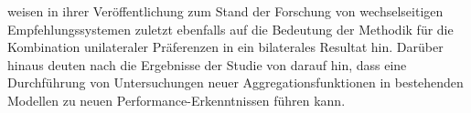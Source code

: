 \textcite[S. 41f.]{palomares:article} weisen in ihrer Veröffentlichung zum Stand der Forschung von wechselseitigen Empfehlungssystemen zuletzt ebenfalls auf die Bedeutung der Methodik für die Kombination unilateraler Präferenzen in ein bilaterales Resultat hin.
Darüber hinaus deuten nach \textcite[S. 42]{palomares:article} die Ergebnisse der Studie von \textcite[S. 4031ff.]{neve:inproceedings} darauf hin, dass eine Durchführung von Untersuchungen neuer Aggregationsfunktionen in bestehenden Modellen zu neuen Performance-Erkenntnissen führen kann.



